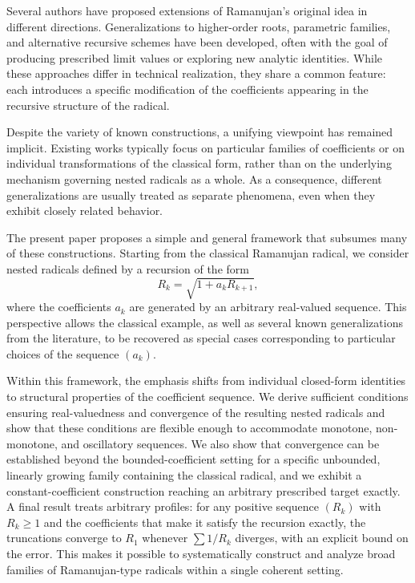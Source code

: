 \documentclass[11pt,a4paper]{amsart}
\theoremstyle{plain}
\theoremstyle{definition}
\theoremstyle{remark}
\begin{document}
Several authors have proposed extensions of Ramanujan’s original idea in different directions. Generalizations to higher-order roots, parametric families, and alternative recursive schemes have been developed, often with the goal of producing prescribed limit values or exploring new analytic identities. While these approaches differ in technical realization, they share a common feature: each introduces a specific modification of the coefficients appearing in the recursive structure of the radical.

Despite the variety of known constructions, a unifying viewpoint has remained implicit. Existing works typically focus on particular families of coefficients or on individual transformations of the classical form, rather than on the underlying mechanism governing nested radicals as a whole. As a consequence, different generalizations are usually treated as separate phenomena, even when they exhibit closely related behavior.

The present paper proposes a simple and general framework that subsumes many of these constructions. Starting from the classical Ramanujan radical, we consider nested radicals defined by a recursion of the form
\[
R_k = \sqrt{1 + a_k R_{k+1}},
\]
where the coefficients \(a_k\) are generated by an arbitrary real-valued sequence. This perspective allows the classical example, as well as several known generalizations from the literature, to be recovered as special cases corresponding to particular choices of the sequence \((a_k)\).

Within this framework, the emphasis shifts from individual closed-form identities to structural properties of the coefficient sequence. We derive sufficient conditions ensuring real-valuedness and convergence of the resulting nested radicals and show that these conditions are flexible enough to accommodate monotone, non-monotone, and oscillatory sequences. We also show that convergence can be established beyond the bounded-coefficient setting for a specific unbounded, linearly growing family containing the classical radical, and we exhibit a constant-coefficient construction reaching an arbitrary prescribed target exactly. A final result treats arbitrary profiles: for any positive sequence $(R_k)$ with $R_k\ge 1$ and the coefficients that make it satisfy the recursion exactly, the truncations converge to $R_1$ whenever $\sum 1/R_k$ diverges, with an explicit bound on the error. This makes it possible to systematically construct and analyze broad families of Ramanujan-type radicals within a single coherent setting.
\end{document}
